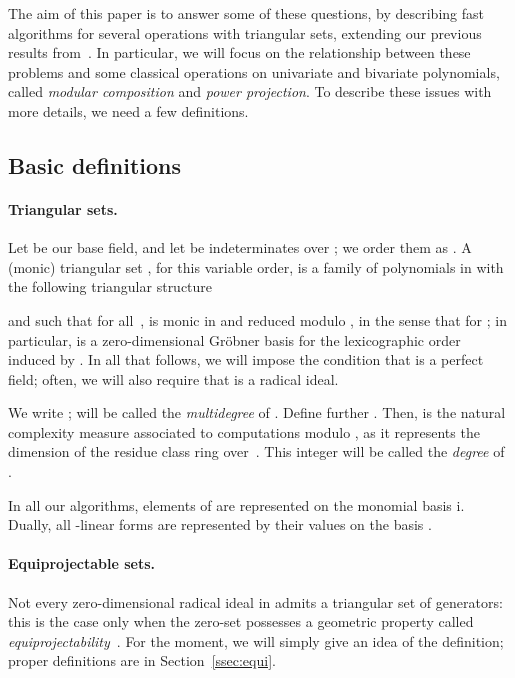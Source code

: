 \documentclass[12pt]{article}
\begin{document}
The aim of this paper is to answer some of these questions, by
describing fast algorithms for several operations with triangular
sets, extending our previous results from~\cite{PoSc10}. In
particular, we will focus on the relationship between these problems
and some classical operations on univariate and bivariate polynomials,
called {\em modular composition} and {\em power projection}. To
describe these issues with more details, we need a few definitions.



\subsection{Basic definitions}\label{ssec:equiproj}

\paragraph{Triangular sets.} Let  be our base field, and let
 be indeterminates over ; we order them as .  A (monic) triangular set , for
this variable order, is a family of polynomials in  with the
following triangular structure

and such that for all~,  is monic in  and reduced modulo
, in the sense that  for ; in particular,  is a zero-dimensional
Gr\"obner basis for the lexicographic order induced by . In all that follows, we will impose the condition that  is a
perfect field; often, we will also require that 
is a radical ideal.

We write ;  will be called the
{\em multidegree} of . Define further . Then,  is the natural
complexity measure associated to computations modulo , as it represents the dimension of the residue class ring
 over~. This integer will be called the {\em degree} of
.

In all our algorithms, elements of  are represented on the
monomial basis i. Dually, all -linear forms  are represented by their values on the basis .

\paragraph{Equiprojectable sets.} Not every zero-dimensional radical ideal  in
 admits a triangular set of generators: this is the case only
when the zero-set  possesses a
geometric property called {\em equiprojectability}~\cite{AuVa00}. For
the moment, we will simply give an idea of the definition; proper
definitions are in Section~\ref{ssec:equi}.
\end{document}

